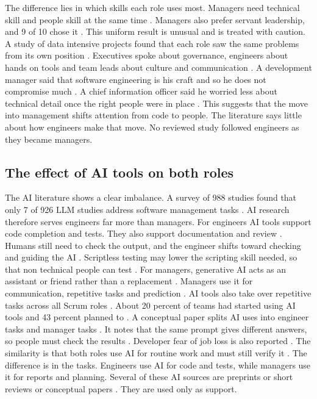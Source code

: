 \documentclass[conference]{IEEEtran}
\begin{document}
The difference lies in which skills each role uses most. Managers need technical skill and people skill at the same time \cite{kalluri2025}. Managers also prefer servant leadership, and 9 of 10 chose it \cite{nguyen2016c}. This uniform result is unusual and is treated with caution. A study of data intensive projects found that each role saw the same problems from its own position \cite{graetsch2023}. Executives spoke about governance, engineers about hands on tools and team leads about culture and communication \cite{graetsch2023}. A development manager said that software engineering is his craft and so he does not compromise much \cite{graetsch2023}. A chief information officer said he worried less about technical detail once the right people were in place \cite{graetsch2023}. This suggests that the move into management shifts attention from code to people. The literature says little about how engineers make that move. No reviewed study followed engineers as they became managers.

\subsection{The effect of AI tools on both roles}

The AI literature shows a clear imbalance. A survey of 988 studies found that only 7 of 926 LLM studies address software management tasks \cite{zhang2026}. AI research therefore serves engineers far more than managers. For engineers AI tools support code completion and tests. They also support documentation and review \cite{zhao2025,gao2024}. Humans still need to check the output, and the engineer shifts toward checking and guiding the AI \cite{gao2024}. Scriptless testing may lower the scripting skill needed, so that non technical people can test \cite{viswanathan2024}. For managers, generative AI acts as an assistant or friend rather than a replacement \cite{assalaarachchi2025}. Managers use it for communication, repetitive tasks and prediction \cite{assalaarachchi2025}. AI tools also take over repetitive tasks across all Scrum roles \cite{pashchenko2025}. About 20 percent of teams had started using AI tools and 43 percent planned to \cite{pashchenko2025}. A conceptual paper splits AI uses into engineer tasks and manager tasks \cite{bahi2024}. It notes that the same prompt gives different answers, so people must check the results \cite{bahi2024}. Developer fear of job loss is also reported \cite{zhao2025}. The similarity is that both roles use AI for routine work and must still verify it \cite{gao2024,bahi2024,assalaarachchi2025}. The difference is in the tasks. Engineers use AI for code and tests, while managers use it for reports and planning. Several of these AI sources are preprints or short reviews or conceptual papers \cite{gao2024,zhao2025,viswanathan2024,bahi2024}. They are used only as support.
\end{document}
